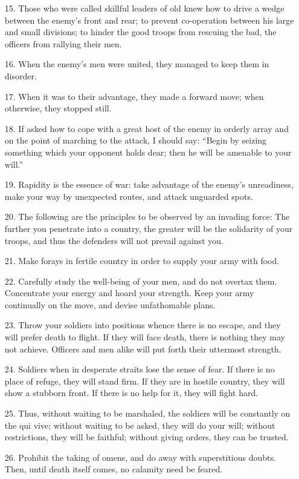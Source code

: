 \documentclass[11pt,openany]{memoir}
\newcommand{\enumeratemargin}{1.30em}
\begin{document}
\begin{enumerate}[leftmargin=\enumeratemargin]
\item[15.] Those who were called skillful leaders of old knew how to drive a wedge between the enemy's front and rear; to prevent co-operation between his large and small divisions; to hinder the good troops from rescuing the bad, the officers from rallying their men.
\item[16.] When the enemy's men were united, they managed to keep them in disorder.
\item[17.] When it was to their advantage, they made a forward move; when otherwise, they stopped still.
\item[18.] If asked how to cope with a great host of the enemy in orderly array and on the point of marching to the attack, I should say: ``Begin by seizing something which your opponent holds dear; then he will be amenable to your will.''
\item[19.] Rapidity is the essence of war: take advantage of the enemy's unreadiness, make your way by unexpected routes, and attack unguarded spots.
\item[20.] The following are the principles to be observed by an invading force: The further you penetrate into a country, the greater will be the solidarity of your troops, and thus the defenders will not prevail against you.
\item[21.] Make forays in fertile country in order to supply your army with food.
\item[22.] Carefully study the well-being of your men, and do not overtax them. Concentrate your energy and hoard your strength. Keep your army continually on the move, and devise unfathomable plans.
\item[23.] Throw your soldiers into positions whence there is no escape, and they will prefer death to flight. If they will face death, there is nothing they may not achieve. Officers and men alike will put forth their uttermost strength.
\item[24.] Soldiers when in desperate straits lose the sense of fear. If there is no place of refuge, they will stand firm. If they are in hostile country, they will show a stubborn front. If there is no help for it, they will fight hard.
\item[25.] Thus, without waiting to be marshaled, the soldiers will be constantly on the qui vive; without waiting to be asked, they will do your will; without restrictions, they will be faithful; without giving orders, they can be trusted.
\item[26.] Prohibit the taking of omens, and do away with superstitious doubts. Then, until death itself comes, no calamity need be feared.

\end{enumerate}
\end{document}
